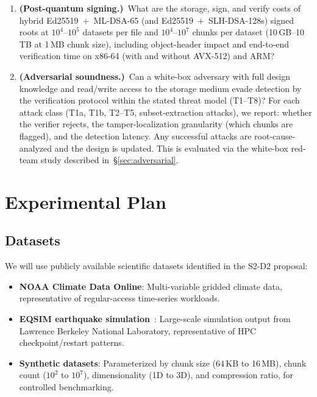 \documentclass[11pt]{article}
\begin{document}
\begin{enumerate}[label=\textbf{RQ\arabic*}]
    size~$|\pi|$ for verifiable hyperslab subset extraction
    (\S\ref{sec:subset}) as a function of hyperslab shape (rectangular,
    strided, sparse), dataset chunk grid, and companion-dataset layout, and
    what is the proof-construction and proof-verification latency relative
    to the bandwidth saved over a na\"{\i}ve full-dataset re-download?
  \item \textbf{(Post-quantum signing.)}~What are the storage, sign, and
    verify costs of hybrid Ed25519~$+$~ML-DSA-65 (and Ed25519~$+$~SLH-DSA-128s)
    signed roots at $10^4$--$10^5$ datasets per file and $10^4$--$10^7$
    chunks per dataset (10\,GB--10\,TB at 1\,MB chunk size), including object-header impact and end-to-end
    verification time on x86-64 (with and without AVX-512) and ARM?
  \item \textbf{(Adversarial soundness.)}~Can a white-box adversary with
    full design knowledge and read/write access to the storage medium evade
    detection by the verification protocol within the stated threat model
    (T1--T8)? For each attack class (T1a, T1b, T2--T5, subset-extraction
    attacks), we report: whether the verifier rejects, the tamper-localization
    granularity (which chunks are flagged), and the detection latency. Any
    successful attacks are root-cause-analyzed and the design is updated. This
    is evaluated via the white-box red-team study described
    in~\S\ref{sec:adversarial}.
\end{enumerate}


\section{Experimental Plan}
\label{sec:experiments}

\subsection{Datasets}

We will use publicly available scientific datasets identified in the S2-D2
proposal:

\begin{itemize}[nosep]
  \item \textbf{NOAA Climate Data Online}: Multi-variable gridded climate data,
    representative of regular-access time-series workloads.
  \item \textbf{EQSIM earthquake simulation}~\cite{mccallen2021eqsim}:
    Large-scale simulation output from Lawrence Berkeley National Laboratory,
    representative of HPC checkpoint/restart patterns.
  \item \textbf{Synthetic datasets}: Parameterized by chunk size (64\,KB to
    16\,MB), chunk count ($10^2$ to $10^7$), dimensionality (1D to 3D), and
    compression ratio, for controlled benchmarking.
\end{itemize}
\end{document}
